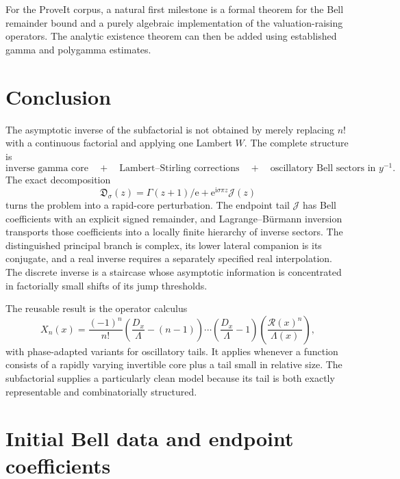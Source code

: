 \documentclass[11pt,a4paper]{article}
\numberwithin{equation}{section}
\theoremstyle{definition}
\theoremstyle{remark}
\newcommand{\e}{\mathrm e}
\newcommand{\ii}{\mathrm i}
\newcommand{\Sub}{\mathfrak D}
\newcommand{\Tail}{\mathcal J}
\newcommand{\Lam}{\Lambda}
\newcommand{\Res}{\mathcal R}
\begin{document}
For the ProveIt corpus, a natural first milestone is a formal theorem for the
Bell remainder bound and a purely algebraic implementation of the
valuation-raising operators.  The analytic existence theorem can then be
added using established gamma and polygamma estimates.

\section{Conclusion}
\label{sec:conclusion}

The asymptotic inverse of the subfactorial is not obtained by merely replacing
$n!$ with a continuous factorial and applying one Lambert $W$.  The complete
structure is
\begin{equation}\label{eq:conclusion-structure}
 \boxed{
 \text{inverse gamma core}
 \quad+\quad
 \text{Lambert--Stirling corrections}
 \quad+\quad
 \text{oscillatory Bell sectors in }y^{-1}.
 }
\end{equation}
The exact decomposition
\[
 \Sub_\sigma(z)=\Gamma(z+1)/\e+
 \e^{\ii\sigma\pi z}\Tail(z)
\]
turns the problem into a rapid-core perturbation.  The endpoint tail
$\Tail$ has Bell coefficients with an explicit signed remainder, and
Lagrange--B\"urmann inversion transports those coefficients into a locally
finite hierarchy of inverse sectors.  The distinguished principal branch is
complex, its lower lateral companion is its conjugate, and a real inverse
requires a separately specified real interpolation.  The discrete inverse is
a staircase whose asymptotic information is concentrated in factorially
small shifts of its jump thresholds.

The reusable result is the operator calculus
\[
 X_n(x)=\frac{(-1)^n}{n!}
 \left(\frac{D_x}{\Lam}-(n-1)\right)\cdots
 \left(\frac{D_x}{\Lam}-1\right)
 \left(\frac{\Res(x)^n}{\Lam(x)}\right),
\]
with phase-adapted variants for oscillatory tails.  It applies whenever a
function consists of a rapidly varying invertible core plus a tail small in
relative size.  The subfactorial supplies a particularly clean model because
its tail is both exactly representable and combinatorially structured.

\appendix

\section{Initial Bell data and endpoint coefficients}
\label{app:Bell-data}
\end{document}
